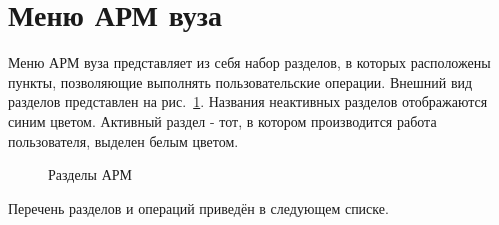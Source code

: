 \graphicspath{ {images/menu/} }
\section{Меню АРМ вуза}
Меню АРМ вуза представляет из себя набор разделов, в которых расположены пункты, позволяющие выполнять пользовательские операции. Внешний вид разделов представлен на рис.~\ref{img:menu:nav_menu}. Названия неактивных разделов отображаются синим цветом. Активный раздел - тот, в котором производится работа пользователя, выделен белым цветом.

\begin{figure}[H]
	\caption{Разделы АРМ}
	\label{img:menu:nav_menu}
\end{figure}

Перечень разделов и операций приведён в следующем списке.


